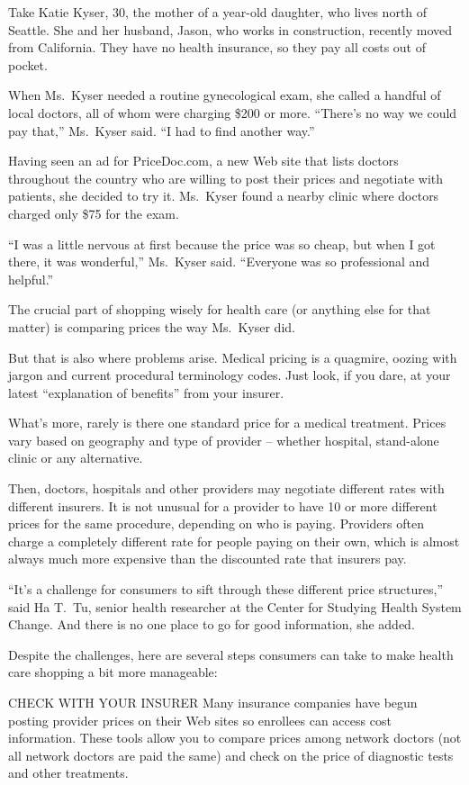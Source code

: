 ﻿\documentclass[12pt]{article}
\begin{document}
Take Katie Kyser, 30, the mother of a year-old daughter, who lives north of Seattle. She and her
husband, Jason, who works in construction, recently moved from California. They have no health
insurance, so they pay all costs out of pocket.

When Ms.~Kyser needed a routine gynecological exam, she called a handful of local doctors, all of
whom were charging \$200 or more. ``There's no way we could pay that,'' Ms.~Kyser said. ``I had to
find another way.''

Having seen an ad for PriceDoc.com, a new Web site that lists doctors throughout the country who are
willing to post their prices and negotiate with patients, she decided to try it. Ms.~Kyser found a
nearby clinic where doctors charged only \$75 for the exam.

``I was a little nervous at first because the price was so cheap, but when I got there, it was
wonderful,'' Ms.~Kyser said. ``Everyone was so professional and helpful.''

The crucial part of shopping wisely for health care (or anything else for that matter) is comparing
prices the way Ms.~Kyser did.

But that is also where problems arise. Medical pricing is a quagmire, oozing with jargon and current
procedural terminology codes. Just look, if you dare, at your latest ``explanation of benefits''
from your insurer.

What's more, rarely is there one standard price for a medical treatment. Prices vary based on
geography and type of provider -- whether hospital, stand-alone clinic or any alternative.

Then, doctors, hospitals and other providers may negotiate different rates with different insurers.
It is not unusual for a provider to have 10 or more different prices for the same procedure,
depending on who is paying. Providers often charge a completely different rate for people paying on
their own, which is almost always much more expensive than the discounted rate that insurers pay.

``It's a challenge for consumers to sift through these different price structures,'' said Ha T.~Tu,
senior health researcher at the Center for Studying Health System Change. And there is no one place
to go for good information, she added.

Despite the challenges, here are several steps consumers can take to make health care shopping a bit
more manageable:

CHECK WITH YOUR INSURER Many insurance companies have begun posting provider prices on their Web
sites so enrollees can access cost information. These tools allow you to compare prices among
network doctors (not all network doctors are paid the same) and check on the price of diagnostic
tests and other treatments.
\end{document}
